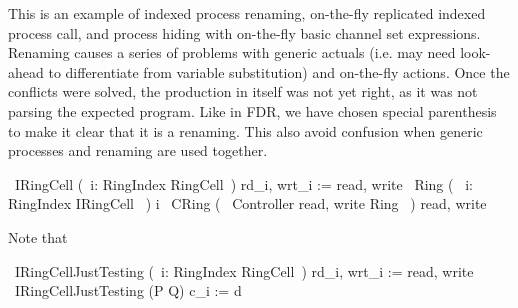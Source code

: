 \documentclass{article}
\begin{document}
This is an example of indexed process renaming,
on-the-fly replicated indexed process call, and
process hiding with on-the-fly basic channel set expressions.
Renaming causes a series of problems with generic actuals (i.e. may need look-ahead to differentiate
from variable substitution) and on-the-fly actions.
Once the conflicts were solved, the production in itself was not yet right, as it was not parsing the expected program.
Like in FDR, we have chosen special parenthesis to make it clear that it is a renaming. This also avoid confusion when
generic processes and renaming are used together.
%
\begin{circus}
  \circprocess\ IRingCell \circdef (~i: RingIndex \circindex RingCell~) \lcircrename rd\_i, wrt\_i := read, write \rcircrename
  \also
  \circprocess\ Ring \circdef (~ \Interleave i: RingIndex \circindex IRingCell ~) \circlinst i \circrinst
  \also
  \circprocess\ CRing \circdef (~ Controller \lpar \lchanset read, write \rchanset \rpar Ring ~) \circhide \lchanset read, write \rchanset
\end{circus}
%
Note that
\begin{circus}
  \circprocess\ IRingCellJustTesting \circdef (~i: RingIndex \circspot RingCell~) \lcircrename rd\_i, wrt\_i := read, write \rcircrename
  \also
  \circprocess\ IRingCellJustTesting \circdef (P \extchoice Q) \lcircrename c\_i := d \rcircrename

\end{circus}
\end{document}
